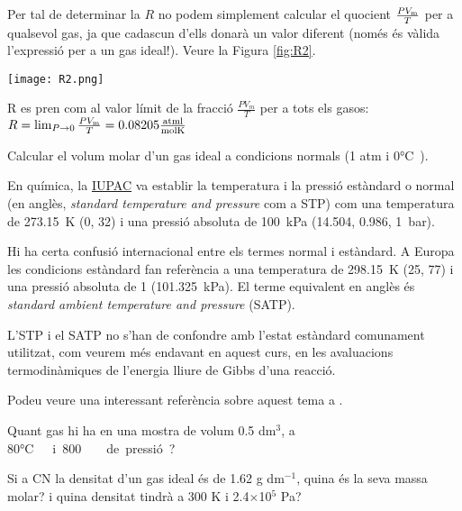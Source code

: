 Per tal de determinar la $R$ no podem simplement calcular el quocient $\frac{P V_{\rm m}}{T}$ per a qualsevol gas, ja que cadascun d'ells donarà un valor diferent (només és vàlida l'expressió per a un gas ideal!). Veure la Figura \ref{fig:R2}.
\begin{marginfigure}
\centering
\texttt{[image: R2.png]}
\caption[Determinació de la constant dels gasos $R$]{R es pren com al valor límit de la fracció $\frac{P V_m}{T}$ per a tots els gasos: 
$R=\lim_{P \to 0} \frac{P V_{\rm m}}{T}= 0.08205 \frac{{\rm atm l}}{{\rm mol K}}$
}
\label{fig:R2}
\end{marginfigure}
\begin{exr}
    Calcular el volum molar d'un gas ideal a condicions normals (1 atm i 0\si\degreeCelsius).
    \end{exr}

\begin{mybox}[title=Condicions normals (o estàndard) de temperatura i pressió]
    En química, la \href{https://iupac.org/}{IUPAC} va establir la temperatura i la pressió estàndard o normal (en anglès, \emph{standard temperature and pressure} com a STP) com una temperatura de \qty{273.15}{\kelvin} (\qty{0}{\degC}, \qty{32}{\degF}) i una pressió absoluta de \qty{100}{\kilo\pascal} (\qty{14.504}{\psi}, \qty{0.986}{\atm}, \qty{1}{\bar}). 
    
    Hi ha certa confusió internacional entre els termes normal i estàndard. A Europa les condicions estàndard fan referència a una temperatura de \qty{298.15}{\kelvin} (\qty{25}{\degC}, \qty{77}{\degF}) i una pressió absoluta de \qty{1}{\atm} (\qty{101.325}{\kilo\pascal}). El terme equivalent en anglès és \emph{standard ambient temperature and pressure} (SATP). 
    
    L'STP i el SATP no s'han de confondre amb l'estat estàndard comunament utilitzat, com veurem més endavant en aquest curs, en les avaluacions termodinàmiques de l'energia lliure de Gibbs d'una reacció.

    Podeu veure una interessant referència sobre aquest tema a \cite{doiron_20_2007}.
\end{mybox}

\begin{exr}
    Quant gas hi ha en una mostra de volum 0.5 dm$^3$, a 80\si\degreeCelsius\ i 800 \si\torr\ de pressió?
    \end{exr}

       
    \begin{exr}
        Si a CN la densitat d'un gas ideal és de 1.62 g dm$^{-1}$, quina és la seva massa molar? i quina densitat tindrà a 300 K i 2.4$\times$10$^5$ Pa?
        \end{exr}

